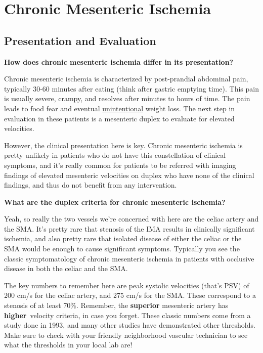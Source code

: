 \documentclass[
]{book}
\begin{document}
\hypertarget{chronic-mesenteric-ischemia}{%
\section{Chronic Mesenteric Ischemia}\label{chronic-mesenteric-ischemia}}

\hypertarget{presentation-and-evaluation-1}{%
\subsection{Presentation and Evaluation}\label{presentation-and-evaluation-1}}

\textbf{How does chronic mesenteric ischemia differ in its presentation?}

Chronic mesenteric ischemia is characterized by post-prandial abdominal
pain, typically 30-60 minutes after eating (think after gastric emptying
time). This pain is usually severe, crampy, and resolves after minutes
to hours of time. The pain leads to food fear and eventual
\uline{unintentional} weight loss. The next step in evaluation in
these patients is a mesenteric duplex to evaluate for elevated
velocities.

However, the clinical presentation here is key. Chronic mesenteric
ischemia is pretty unlikely in patients who do not have this
constellation of clinical symptoms, and it's really common for patients
to be referred with imaging findings of elevated mesenteric velocities
on duplex who have none of the clinical findings, and thus do not
benefit from any intervention.

\textbf{What are the duplex criteria for chronic mesenteric ischemia?}

Yeah, so really the two vessels we're concerned with here are the celiac
artery and the SMA. It's pretty rare that stenosis of the IMA results in
clinically significant ischemia, and also pretty rare that isolated
disease of either the celiac or the SMA would be enough to cause
significant symptoms. Typically you see the classic symptomatology of
chronic mesenteric ischemia in patients with occlusive disease in both
the celiac and the SMA.

The key numbers to remember here are peak systolic velocities (that's
PSV) of 200 cm/s for the celiac artery, and 275 cm/s for the SMA. These
correspond to a stenosis of at least 70\%. Remember, the \textbf{superior}
mesenteric artery has \textbf{higher}~velocity criteria, in case you forget.
These classic numbers come from a study done in 1993, and many other
studies have demonstrated other thresholds. Make sure to check with your
friendly neighborhood vascular technician to see what the thresholds in
your local lab are!
\end{document}
